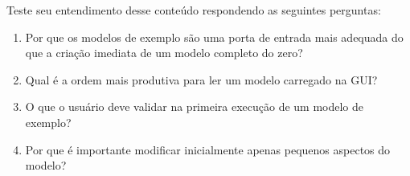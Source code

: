 Teste seu entendimento desse conteúdo respondendo as seguintes perguntas:

\begin{enumerate}
    \item Por que os modelos de exemplo são uma porta de entrada mais adequada do que a criação imediata de um modelo completo do zero?

    \item Qual é a ordem mais produtiva para ler um modelo carregado na GUI?

    \item O que o usuário deve validar na primeira execução de um modelo de exemplo?

    \item Por que é importante modificar inicialmente apenas pequenos aspectos do modelo?
\end{enumerate}